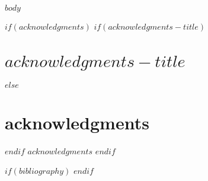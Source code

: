 \documentclass[
$if(twoside)$
twoside,
$endif$
$if(openright)$
openright,
$endif$
$if(title)$
titlepage,
$endif$
numbers=noenddot,
headinclude,
footinclude,
cleardoublepage=empty,
abstract=on,
$if(paper)$
paper=$paper$,
$endif$
$if(fontsize)$
fontsize=$fontsize$
$endif$
BCOR=5mm
]{scrreprt}
\begin{document}
\cleardoublepage
\pagestyle{scrheadings}

$body$

$if(acknowledgments)$
$if(acknowledgments-title)$
\chapter*{$acknowledgments-title$}
$else$
\chapter*{acknowledgments}
$endif$
$acknowledgments$
$endif$

$if(bibliography)$
\printbibliography[heading=bibintoc]
$endif$
\end{document}
